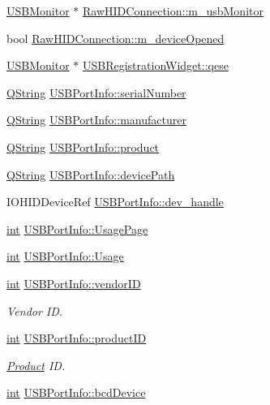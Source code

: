 \begin{DoxyCompactItemize}
\hyperlink{class_u_s_b_monitor}{U\-S\-B\-Monitor} $\ast$ \hyperlink{group___raw_h_i_d_plugin_ga03aaa7c95bd19c0d373b3c2b4e982cdb}{Raw\-H\-I\-D\-Connection\-::m\-\_\-usb\-Monitor}
\item 
bool \hyperlink{group___raw_h_i_d_plugin_ga043f346d34d71eb80f1e33ab78a82286}{Raw\-H\-I\-D\-Connection\-::m\-\_\-device\-Opened}
\item 
\hyperlink{class_u_s_b_monitor}{U\-S\-B\-Monitor} $\ast$ \hyperlink{group___raw_h_i_d_plugin_ga0cc367841d16c562f474b130448cc184}{U\-S\-B\-Registration\-Widget\-::qese}
\item 
\hyperlink{group___u_a_v_objects_plugin_gab9d252f49c333c94a72f97ce3105a32d}{Q\-String} \hyperlink{group___raw_h_i_d_plugin_ga2169d1d082c17498883e6c0497aecb94}{U\-S\-B\-Port\-Info\-::serial\-Number}
\item 
\hyperlink{group___u_a_v_objects_plugin_gab9d252f49c333c94a72f97ce3105a32d}{Q\-String} \hyperlink{group___raw_h_i_d_plugin_ga2ab42268838049538e60aa4a7aa3d305}{U\-S\-B\-Port\-Info\-::manufacturer}
\item 
\hyperlink{group___u_a_v_objects_plugin_gab9d252f49c333c94a72f97ce3105a32d}{Q\-String} \hyperlink{group___raw_h_i_d_plugin_ga8b2fb49e267664c4838e1205f57538d8}{U\-S\-B\-Port\-Info\-::product}
\item 
\hyperlink{group___u_a_v_objects_plugin_gab9d252f49c333c94a72f97ce3105a32d}{Q\-String} \hyperlink{group___raw_h_i_d_plugin_ga36eeebfb55ca4f88026f111f51793d18}{U\-S\-B\-Port\-Info\-::device\-Path}
\item 
I\-O\-H\-I\-D\-Device\-Ref \hyperlink{group___raw_h_i_d_plugin_gaa788f428f81fe24d5fd83a27fc3761c2}{U\-S\-B\-Port\-Info\-::dev\-\_\-handle}
\item 
\hyperlink{ioapi_8h_a787fa3cf048117ba7123753c1e74fcd6}{int} \hyperlink{group___raw_h_i_d_plugin_gaf3ad5590777743b25c22c4f07fd897c0}{U\-S\-B\-Port\-Info\-::\-Usage\-Page}
\item 
\hyperlink{ioapi_8h_a787fa3cf048117ba7123753c1e74fcd6}{int} \hyperlink{group___raw_h_i_d_plugin_ga8d2e5748b1fc39dcfaf4d3fc4aba9375}{U\-S\-B\-Port\-Info\-::\-Usage}
\item 
\hyperlink{ioapi_8h_a787fa3cf048117ba7123753c1e74fcd6}{int} \hyperlink{group___raw_h_i_d_plugin_ga506f2c8d425d78dd0ad899f8e5740729}{U\-S\-B\-Port\-Info\-::vendor\-I\-D}
\begin{DoxyCompactList}\small\item\em Vendor I\-D. \end{DoxyCompactList}\item 
\hyperlink{ioapi_8h_a787fa3cf048117ba7123753c1e74fcd6}{int} \hyperlink{group___raw_h_i_d_plugin_ga5bcd5b32d008f2c5cd5a6d3b7ec23b97}{U\-S\-B\-Port\-Info\-::product\-I\-D}
\begin{DoxyCompactList}\small\item\em \hyperlink{class_product}{Product} I\-D. \end{DoxyCompactList}\item 
\hyperlink{ioapi_8h_a787fa3cf048117ba7123753c1e74fcd6}{int} \hyperlink{group___raw_h_i_d_plugin_ga546927dd722c593c7acfca1cb045494d}{U\-S\-B\-Port\-Info\-::bcd\-Device}
\end{DoxyCompactItemize}
